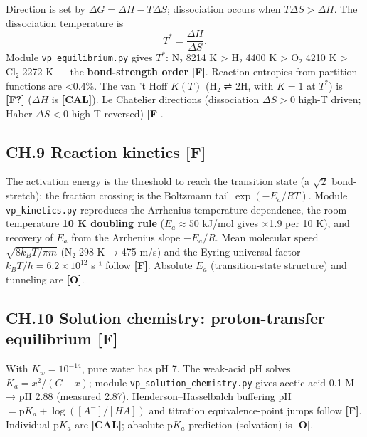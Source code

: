 \documentclass[
  10pt,
]{article}
\begin{document}
Direction is set by \(\Delta G = \Delta H - T\Delta S\); dissociation
occurs when \(T\Delta S > \Delta H\). The dissociation temperature is
\[ T^* = \frac{\Delta H}{\Delta S}. \] Module
\texttt{vp\_equilibrium.py} gives \(T^*\): N₂ 8214 K \textgreater{} H₂
4400 K \textgreater{} O₂ 4210 K \textgreater{} Cl₂ 2272 K --- the
\textbf{bond-strength order} \textbf{{[}F{]}}. Reaction entropies from
partition functions are \textless0.4\%. The van 't Hoff \(K(T)\) (H₂ ⇌
2H, with \(K=1\) at \(T^*\)) is \textbf{{[}F?{]}} (\(\Delta H\) is
\textbf{{[}CAL{]}}). Le Chatelier directions (dissociation
\(\Delta S>0\) high-T driven; Haber \(\Delta S<0\) high-T reversed)
\textbf{{[}F{]}}.

\hypertarget{ch.9-reaction-kinetics-f}{%
\subsection{\texorpdfstring{CH.9 Reaction kinetics
\textbf{{[}F{]}}}{CH.9 Reaction kinetics {[}F{]}}}\label{ch.9-reaction-kinetics-f}}

The activation energy is the threshold to reach the transition state (a
\(\sqrt2\) bond-stretch); the fraction crossing is the Boltzmann tail
\(\exp(-E_a/RT)\). Module \texttt{vp\_kinetics.py} reproduces the
Arrhenius temperature dependence, the room-temperature \textbf{10 K
doubling rule} (\(E_a\approx 50\) kJ/mol gives ×1.9 per 10 K), and
recovery of \(E_a\) from the Arrhenius slope \(-E_a/R\). Mean molecular
speed \(\sqrt{8k_BT/\pi m}\) (N₂ 298 K → 475 m/s) and the Eyring
universal factor \(k_BT/h = 6.2\times10^{12}\) s⁻¹ follow
\textbf{{[}F{]}}. Absolute \(E_a\) (transition-state structure) and
tunneling are \textbf{{[}O{]}}.

\hypertarget{ch.10-solution-chemistry-proton-transfer-equilibrium-f}{%
\subsection{\texorpdfstring{CH.10 Solution chemistry: proton-transfer
equilibrium
\textbf{{[}F{]}}}{CH.10 Solution chemistry: proton-transfer equilibrium {[}F{]}}}\label{ch.10-solution-chemistry-proton-transfer-equilibrium-f}}

With \(K_w = 10^{-14}\), pure water has pH 7. The weak-acid pH solves
\(K_a = x^2/(C-x)\); module \texttt{vp\_solution\_chemistry.py} gives
acetic acid 0.1 M → pH 2.88 (measured 2.87). Henderson--Hasselbalch
buffering pH \(= \mathrm pK_a + \log([A^-]/[HA])\) and titration
equivalence-point jumps follow \textbf{{[}F{]}}. Individual
\(\mathrm pK_a\) are \textbf{{[}CAL{]}}; absolute \(\mathrm pK_a\)
prediction (solvation) is \textbf{{[}O{]}}.
\end{document}
